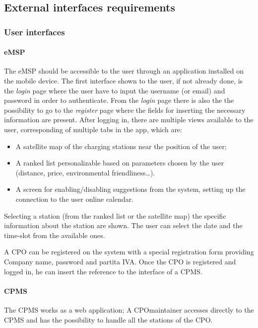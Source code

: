 \subsection{External interfaces requirements}

\subsubsection{User interfaces}
\paragraph{\ac{eMSP}}
The \ac{eMSP} should be accessible to the user through an application installed on the mobile device.
The first interface shown to the user, if not already done, is the \textit{login} page where the user have to input the username (or email) and password in order to authenticate.
From the \textit{login} page there is also the the possibility to go to the \textit{register} page where the fields for inserting the necessary information are present.
After logging in, there are multiple views available to the user, corresponding of multiple tabs in the app, which are:
\begin{itemize}
    \item A satellite map of the charging stations near the position of the user;
    \item A ranked list personalizable based on parameters chosen by the user (distance, price, environmental friendliness\ldots).
    \item A screen for enabling/disabling suggestions from the system, setting up the connection to the user online calendar.
\end{itemize}
Selecting a station (from the ranked list or the satellite map) the specific information about the station are shown. The user can select the date and the time-slot from the available ones.

A \ac{CPO} can be registered on the system with a special registration form providing Company name, password and \gls{partita IVA}. Once the \ac{CPO} is registered and logged in, he can insert the reference to the interface of a \ac{CPMS}.


\paragraph{\ac{CPMS}}
The \ac{CPMS} works as a web application; A \ac{CPO}maintainer accesses directly to the \ac{CPMS} and has the possibility to handle all the stations of the \ac{CPO}.

